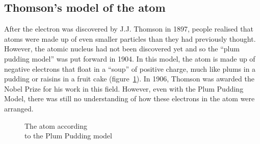             \subsection*{Thomson's model of the atom}
            \nopagebreak
\begin{minipage}{.5\textwidth}
        \label{m38756*id254616}After the electron was discovered by J.J. Thomson in 1897, people realised that atoms were made up of even smaller particles than they had previously thought. However, the atomic nucleus had not been discovered yet and so the ``plum pudding model'' was put forward in 1904. In this model, the atom is made up of negative electrons that float in a ``soup'' of positive charge, much like plums in a pudding or raisins in a fruit cake (figure~\ref{fig:atom:plumpudding}). In 1906, Thomson was awarded the Nobel Prize for his work in this field. However, even with the Plum Pudding Model, there was still no understanding of how these electrons in the atom were arranged.\par 
\end{minipage}
\begin{minipage}{.5\textwidth}
	\begin{figure}[H] %
    \begin{center}
\begin{minipage}{.8\textwidth}
\caption{The atom according \\ to the Plum Pudding model}
\end{minipage}
\label{fig:atom:plumpudding}
\end{center}
 \end{figure}    
\end{minipage}  
